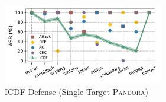 \documentclass[lettersize,journal]{IEEEtran}
\newcommand{\pandora}{{\scshape Pandora}\xspace}
\begin{document}
\begin{figure}[h!]
	\centering
	\includegraphics[keepaspectratio,height=3.5cm]{Graph/Evaluation/Figure-last.pdf}
	\caption{ICDF Defense (Single-Target \pandora)}
	\label{fig:APIGraph-targeted-defense}
\end{figure}
\end{document}
